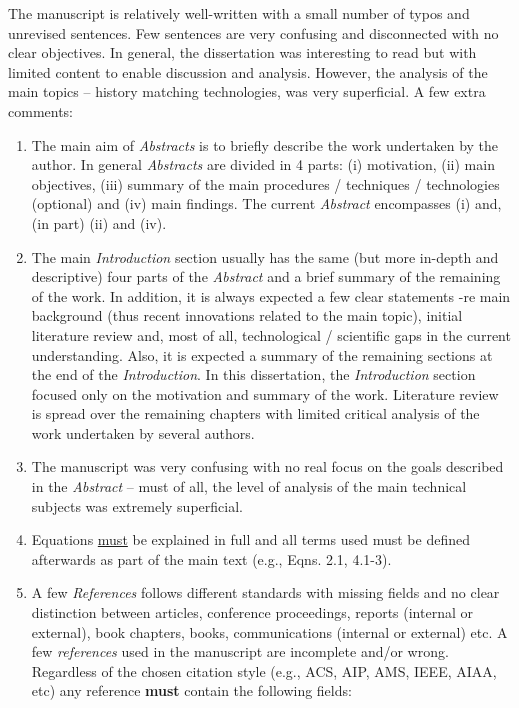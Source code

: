 \documentclass[14pt,twoside]{report}
\begin{document}
The manuscript is relatively well-written with a small number of typos and unrevised sentences. Few sentences are very confusing and disconnected with no clear objectives. In general, the dissertation was interesting to read but with limited content to enable discussion and analysis. However, the analysis of the main topics -- history matching technologies,  was very superficial. A few extra comments:
\begin{enumerate}
\item The main aim of {\it Abstracts} is to briefly describe the work undertaken by the author. In general {\it Abstracts} are divided in 4 parts: (i) motivation, (ii) main objectives, (iii) summary of the main procedures / techniques / technologies (optional) and (iv) main findings. The current {\it Abstract} encompasses (i) and, (in part) (ii) and (iv).
%
\item The main {\it Introduction} section usually has the same (but more in-depth and descriptive) four parts of the {\it Abstract} and a brief summary of the remaining of the work. In addition, it is always expected a few clear statements -re main background (thus recent innovations related to the main topic), initial literature review and, most of all, technological / scientific gaps in the current understanding. Also, it is expected a summary of the remaining sections at the end of the {\it Introduction}. In this dissertation, the {\it Introduction} section focused only on the motivation and summary of the work. Literature review is spread over the remaining chapters with limited critical analysis of the work undertaken by several authors. 
%
\item The manuscript was very confusing with no real focus on the goals described in the {\it Abstract} -- must of all, the level of analysis of the main technical subjects was extremely superficial. 
%
\item Equations \underline{must} be explained in full and all terms used must be defined afterwards as part of the main text (e.g., Eqns. 2.1, 4.1-3).
%
\item A few {\it References} follows different standards with missing fields and no clear distinction between articles, conference proceedings, reports (internal or external), book chapters, books, communications (internal or external) etc.  A few {\it references} used in the manuscript are incomplete and/or wrong. Regardless of the chosen citation style (e.g., ACS, AIP, AMS, IEEE, AIAA, etc) any reference {\bf must} contain the following fields: 
\begin{enumerate}

\end{enumerate}
\end{enumerate}
\end{document}

